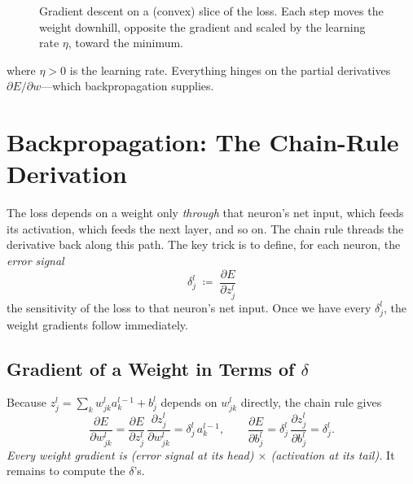 \documentclass[11pt,a4paper]{report}
\theoremstyle{definition}
\theoremstyle{remark}
\newcommand{\pd}[2]{\frac{\partial #1}{\partial #2}}
\begin{document}
\begin{figure}[ht]
\centering
{}
\caption{Gradient descent on a (convex) slice of the loss. Each step moves the
weight downhill, opposite the gradient and scaled by the learning rate $\eta$,
toward the minimum.}
\label{fig:gd}
\end{figure}
where $\eta>0$ is the learning rate. Everything hinges on the partial
derivatives $\partial E/\partial w$---which backpropagation supplies.

\chapter{Backpropagation: The Chain-Rule Derivation}
\label{ch:deriv}

The loss depends on a weight only \emph{through} that neuron's net input, which
feeds its activation, which feeds the next layer, and so on. The chain rule
threads the derivative back along this path. The key trick is to define, for
each neuron, the \emph{error signal}
\begin{equation}
\boxed{\ \delta^{l}_{j}\;\coloneqq\;\pd{E}{z^{l}_{j}}\ }
\label{eq:delta}
\end{equation}
the sensitivity of the loss to that neuron's net input. Once we have every
$\delta^l_j$, the weight gradients follow immediately.

\section{Gradient of a Weight in Terms of $\delta$}
Because $z^{l}_{j}=\sum_k w^{l}_{jk}a^{l-1}_{k}+b^{l}_{j}$ depends on
$w^{l}_{jk}$ directly, the chain rule gives
\begin{equation}
\pd{E}{w^{l}_{jk}}
=\pd{E}{z^{l}_{j}}\,\pd{z^{l}_{j}}{w^{l}_{jk}}
=\delta^{l}_{j}\,a^{l-1}_{k},
\qquad
\pd{E}{b^{l}_{j}}=\delta^{l}_{j}\,\pd{z^{l}_{j}}{b^{l}_{j}}=\delta^{l}_{j}.
\label{eq:gradw}
\end{equation}
\emph{Every weight gradient is (error signal at its head) $\times$ (activation at
its tail).} It remains to compute the $\delta$'s.
\end{document}
